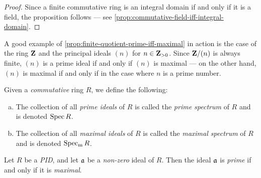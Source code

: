 \begin{proof}
    Since a finite commutative ring is an integral domain if and only if it is a
    field, the proposition follows --- see
    \cref{prop:commutative-field-iff-integral-domain}.
\end{proof}

\begin{example}
    \label{exp:Z/nZ-finite-quotient-prime-iff-maximal-iff-prime-number}
    A good example of \cref{prop:finite-quotient-prime-iff-maximal} in action is the
    case of the ring \(\mathbf{Z}\) and the principal ideals \((n)\) for
    \(n \in \mathbf{Z}_{> 0}\). Since \(\mathbf{Z}/(n)\) is always finite, \((n)\) is a prime ideal
    if and only if \((n)\) is maximal --- on the other hand, \((n)\) is maximal if
    and only if in the case where \(n\) is a prime number.
\end{example}

\begin{definition}
    \label{def:ring-spectrum}
    Given a \emph{commutative} ring \(R\), we define the following:
    \begin{enumerate}[(a)]\setlength\itemsep{0em}
        \item The collection of all \emph{prime ideals} of \(R\) is called the
              \emph{prime spectrum} of \(R\) and is denoted \(\operatorname{Spec} R\).

        \item The collection of all \emph{maximal ideals} of \(R\) is called the
              \emph{maximal spectrum} of \(R\) and is denoted \(\operatorname{Spec_m} R\).
    \end{enumerate}
\end{definition}

\begin{proposition}
    \label{prop:PID-prime-iff-maximal}
    Let \(R\) be a \emph{PID}, and let \(\mathfrak{a}\) be a \emph{non-zero} ideal of
    \(R\). Then the ideal \(\mathfrak{a}\) is \emph{prime} if and only if it is
    \emph{maximal}.
\end{proposition}


